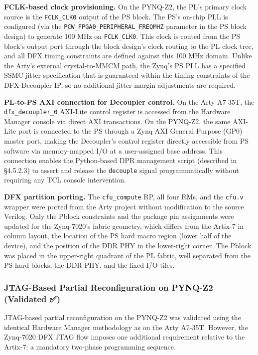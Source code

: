 \textbf{FCLK-based clock provisioning.} On the PYNQ-Z2, the PL's primary clock source is the \texttt{FCLK\_CLK0} output of the PS block. The PS's on-chip PLL is configured (via the \texttt{PCW\_FPGA0\_PERIPHERAL\_FREQMHZ} parameter in the PS block design) to generate 100 MHz on \texttt{FCLK\_CLK0}. This clock is routed from the PS block's output port through the block design's clock routing to the PL clock tree, and all DFX timing constraints are defined against this 100 MHz domain. Unlike the Arty's external crystal-to-MMCM path, the Zynq's PS PLL has a specified SSMC jitter specification that is guaranteed within the timing constraints of the DFX Decoupler IP, so no additional jitter margin adjustments are required.

\textbf{PL-to-PS AXI connection for Decoupler control.} On the Arty A7-35T, the \texttt{dfx\_decoupler\_0} AXI-Lite control register is accessed from the Hardware Manager console via direct AXI transactions. On the PYNQ-Z2, the same AXI-Lite port is connected to the PS through a Zynq AXI General Purpose (GP0) master port, making the Decoupler's control register directly accessible from PS software via memory-mapped I/O at a user-assigned base address. This connection enables the Python-based DPR management script (described in §4.5.2.3) to assert and release the \texttt{decouple} signal programmatically without requiring any TCL console intervention.

\textbf{DFX partition porting.} The \texttt{cfu\_compute} RP, all four RMs, and the \texttt{cfu.v} wrapper were ported from the Arty project without modification to the source Verilog. Only the Pblock constraints and the package pin assignments were updated for the Zynq-7020's fabric geometry, which differs from the Artix-7 in column layout, the location of the PS hard macro region (lower half of the device), and the position of the DDR PHY in the lower-right corner. The Pblock was placed in the upper-right quadrant of the PL fabric, well separated from the PS hard blocks, the DDR PHY, and the fixed I/O tiles.

\subsubsection{JTAG-Based Partial Reconfiguration on PYNQ-Z2 (Validated ✅)}

JTAG-based partial reconfiguration on the PYNQ-Z2 was validated using the identical Hardware Manager methodology as on the Arty A7-35T. However, the Zynq-7020 DFX JTAG flow imposes one additional requirement relative to the Artix-7: a mandatory two-phase programming sequence.

